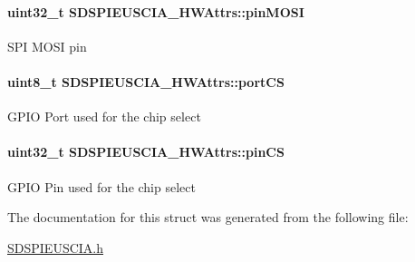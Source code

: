 \paragraph[{pin\+M\+O\+S\+I}]{\setlength{\rightskip}{0pt plus 5cm}uint32\+\_\+t S\+D\+S\+P\+I\+E\+U\+S\+C\+I\+A\+\_\+\+H\+W\+Attrs\+::pin\+M\+O\+S\+I}\label{struct_s_d_s_p_i_e_u_s_c_i_a___h_w_attrs_abe5be1068e92c174db83a87b430c0c6c}
S\+P\+I M\+O\+S\+I pin 
\paragraph[{port\+C\+S}]{\setlength{\rightskip}{0pt plus 5cm}uint8\+\_\+t S\+D\+S\+P\+I\+E\+U\+S\+C\+I\+A\+\_\+\+H\+W\+Attrs\+::port\+C\+S}\label{struct_s_d_s_p_i_e_u_s_c_i_a___h_w_attrs_a669ad55ec90fcc5c37c13b86f23bad1c}
G\+P\+I\+O Port used for the chip select 
\paragraph[{pin\+C\+S}]{\setlength{\rightskip}{0pt plus 5cm}uint32\+\_\+t S\+D\+S\+P\+I\+E\+U\+S\+C\+I\+A\+\_\+\+H\+W\+Attrs\+::pin\+C\+S}\label{struct_s_d_s_p_i_e_u_s_c_i_a___h_w_attrs_acc7a51ef098ed1cc7ef4d930fcd2aada}
G\+P\+I\+O Pin used for the chip select 

The documentation for this struct was generated from the following file\+:\begin{DoxyCompactItemize}
\item 
\hyperlink{_s_d_s_p_i_e_u_s_c_i_a_8h}{S\+D\+S\+P\+I\+E\+U\+S\+C\+I\+A.\+h}\end{DoxyCompactItemize}
